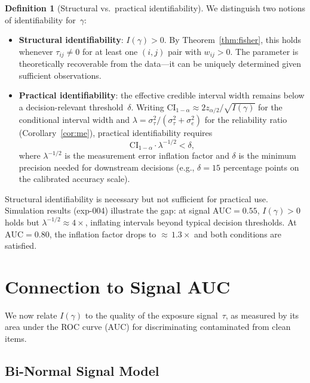 \documentclass[11pt,a4paper]{article}
\theoremstyle{definition}
\newtheorem{definition}[theorem]{Definition}
\begin{document}
\begin{definition}[Structural vs.\ practical identifiability]\label{def:identifiability}
We distinguish two notions of identifiability for~$\gamma$:
\begin{itemize}
\item \textbf{Structural identifiability}: $I(\gamma) > 0$.
  By Theorem~\ref{thm:fisher}, this holds whenever $\tau_{ij} \neq 0$
  for at least one $(i,j)$ pair with $w_{ij} > 0$.
  The parameter is theoretically recoverable from the data---it can be
  uniquely determined given sufficient observations.

\item \textbf{Practical identifiability}: the effective credible interval
  width remains below a decision-relevant threshold~$\delta$.
  Writing $\mathrm{CI}_{1-\alpha} \approx 2z_{\alpha/2}/\sqrt{I(\gamma)}$
  for the conditional interval width and
  $\lambda = \sigma_\tau^2/(\sigma_\tau^2+\sigma_e^2)$ for the reliability
  ratio (Corollary~\ref{cor:me}), practical identifiability requires
  \begin{equation}\label{eq:practical_id}
    \mathrm{CI}_{1-\alpha} \cdot \lambda^{-1/2} < \delta,
  \end{equation}
  where $\lambda^{-1/2}$ is the measurement error inflation factor and
  $\delta$ is the minimum precision needed for downstream decisions
  (e.g., $\delta = 15$ percentage points on the calibrated accuracy scale).
\end{itemize}
Structural identifiability is necessary but not sufficient for practical use.
Simulation results (exp-004) illustrate the gap: at signal $\mathrm{AUC} = 0.55$,
$I(\gamma)>0$ holds but $\lambda^{-1/2}\approx 4\times$, inflating intervals
beyond typical decision thresholds.
At $\mathrm{AUC} = 0.80$, the inflation factor drops to ${\approx}\,1.3\times$
and both conditions are satisfied.
\end{definition}


\section{Connection to Signal AUC}\label{sec:auc}

We now relate $I(\gamma)$ to the quality of the exposure signal~$\tau$,
as measured by its area under the ROC curve (AUC) for discriminating
contaminated from clean items.

\subsection{Bi-Normal Signal Model}\label{ssec:binormal}
\end{document}
